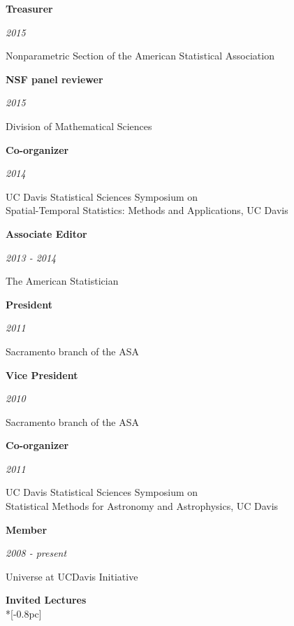 \documentclass[11pt]{article}
\newcommand{\head}[1]{
  \vspace{10pt}
  {\Large \bf #1} \\*[-0.8pc]
  \underline{\hspace{6.07in}}}
\newcommand{\datedentry}[2]{
  \vspace{5pt}
  \begin{minipage}{5in}{\textbf{#1}}\end{minipage}
  \hfill
  \begin{minipage}{1in}{\hfill\textit{#2}}\end{minipage}
  }
\begin{document}
\datedentry{Treasurer}{2015}
Nonparametric Section of the American Statistical Association

\vspace{7pt}

\datedentry{NSF panel reviewer}{2015}
Division of Mathematical Sciences

\vspace{7pt}


\datedentry{Co-organizer}{2014}
UC Davis Statistical Sciences Symposium on \\
Spatial-Temporal Statistics: Methods and Applications, UC Davis

\vspace{7pt}

\datedentry{Associate Editor}{2013 - 2014}
The American Statistician

\vspace{7pt}

\datedentry{President}{2011}
Sacramento branch of the ASA

\vspace{7pt}

\datedentry{Vice President}{2010}
Sacramento branch of the ASA

\vspace{7pt}

\datedentry{Co-organizer}{2011}
UC Davis Statistical Sciences Symposium on \\
Statistical Methods for Astronomy and Astrophysics, UC Davis

\vspace{7pt}

\datedentry{Member}{2008 - present}
Universe at UCDavis Initiative


\vspace{5pt}
\head{Invited Lectures}
\end{document}
